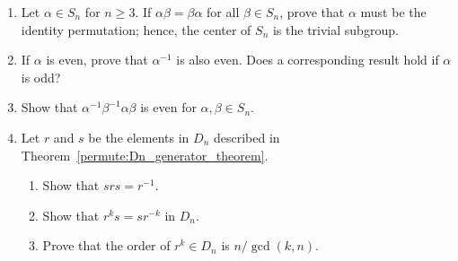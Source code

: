 {\begin{enumerate}
\begin{enumerate}
 
\item
A subgroup $H$ of $S_X$ is {\bfi
transitive} if for every $x, y \in X$, 
there exists a $\sigma \in H$ such that $\sigma(x) =y$. Prove that
$\langle \sigma \rangle$ is transitive if and only if ${\cal O}_{x,
\sigma} = X$ for some $x \in X$. 
 
 
\end{enumerate}
 
 
\item
Let $\alpha \in S_n$ for $n \geq 3$. If $\alpha \beta = \beta \alpha$
for all $\beta \in S_n$, prove that $\alpha$ must be the identity
permutation; hence, the center of $S_n$ is the trivial subgroup. 
 
 
\item
If $\alpha$ is even, prove that $\alpha^{-1}$ is also even. Does a
corresponding result hold if $\alpha$ is odd? 
 
 
\item
Show that  $\alpha^{-1} \beta^{-1} \alpha \beta$ is even for $\alpha,
\beta \in S_n$. 
 
 
\item
Let $r$ and $s$ be the elements in $D_n$ described in Theorem~\ref{permute:Dn_generator_theorem}.
\begin{enumerate}
 
 \item
Show that $srs = r^{-1}$.
 
 \item
Show that $r^k s = s r^{-k}$ in $D_n$.
 
 \item
Prove that the order of $r^k \in D_n$ is $n / \gcd(k,n)$.
  
\end{enumerate}
 
 
\end{enumerate}
}
 
\sagesection
 
